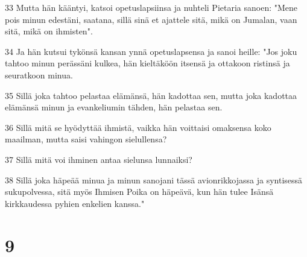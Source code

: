 \par 33 Mutta hän kääntyi, katsoi opetuslapsiinsa ja nuhteli Pietaria sanoen: "Mene pois minun edestäni, saatana, sillä sinä et ajattele sitä, mikä on Jumalan, vaan sitä, mikä on ihmisten".
\par 34 Ja hän kutsui tykönsä kansan ynnä opetuslapsensa ja sanoi heille: "Jos joku tahtoo minun perässäni kulkea, hän kieltäköön itsensä ja ottakoon ristinsä ja seuratkoon minua.
\par 35 Sillä joka tahtoo pelastaa elämänsä, hän kadottaa sen, mutta joka kadottaa elämänsä minun ja evankeliumin tähden, hän pelastaa sen.
\par 36 Sillä mitä se hyödyttää ihmistä, vaikka hän voittaisi omaksensa koko maailman, mutta saisi vahingon sielullensa?
\par 37 Sillä mitä voi ihminen antaa sielunsa lunnaiksi?
\par 38 Sillä joka häpeää minua ja minun sanojani tässä avionrikkojassa ja syntisessä sukupolvessa, sitä myös Ihmisen Poika on häpeävä, kun hän tulee Isänsä kirkkaudessa pyhien enkelien kanssa."

\chapter{9}


